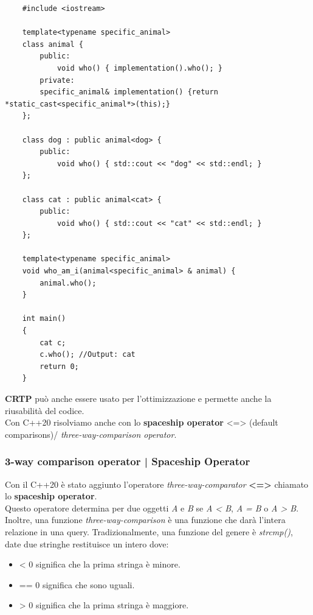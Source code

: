 \begin{lstlisting}
	#include <iostream>
	
	template<typename specific_animal>
	class animal {
		public:
			void who() { implementation().who(); }
		private:
		specific_animal& implementation() {return *static_cast<specific_animal*>(this);}
	};
	
	class dog : public animal<dog> {
		public:
			void who() { std::cout << "dog" << std::endl; }
	};
	
	class cat : public animal<cat> {
		public:
			void who() { std::cout << "cat" << std::endl; }
	};
	
	template<typename specific_animal>
	void who_am_i(animal<specific_animal> & animal) {
		animal.who();
	}
	
	int main()
	{
		cat c;
		c.who(); //Output: cat
		return 0;
	}
\end{lstlisting}

\textsf{\small \textbf{CRTP} può anche essere usato per l'ottimizzazione e permette anche la riusabilità del codice.} \\

\textsf{\small Con C++20 risolviamo anche con lo \textbf{spaceship operator} <=> (default comparisons)/ \emph{three-way-comparison operator}.} \\


\subsubsection{3-way comparison operator | Spaceship Operator}

\textsf{\small Con il C++20 è stato aggiunto l'operatore \emph{three-way-comparator} \textbf{<=>} chiamato lo \textbf{spaceship operator}.} \\

\textsf{\small Questo operatore determina per due oggetti \emph{A} e \emph{B} se \emph{A < B}, \emph{A = B} o \emph{A > B}.} \\

\textsf{\small Inoltre, una funzione \emph{three-way-comparison} è una funzione che darà l'intera relazione in una query. Tradizionalmente, una funzione del genere è \emph{strcmp()}, date due stringhe restituisce un intero dove: } \\

\begin{itemize}
	\item \textsf{\small < 0 significa che la prima stringa è minore.}
	\item \textsf{\small == 0 significa che sono uguali.}
	\item \textsf{\small > 0 significa che la prima stringa è maggiore.}
\end{itemize}

